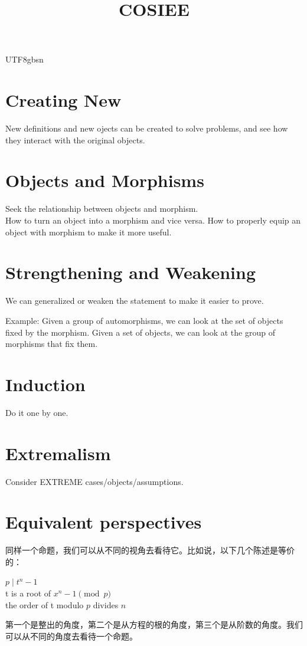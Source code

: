 \documentclass{article}
\begin{document}
\begin{CJK*}{UTF8}{gbsn}

\title{COSIEE}
\maketitle

\section{Creating New}
New definitions and new ojects can be created to solve problems, and see how they interact with the original objects.

\section{Objects and Morphisms}
Seek the relationship between objects and morphism. 
\\
How to turn an object into a morphism and vice versa. How to properly equip an object with morphism to make it more useful. 
\\

\section{Strengthening and Weakening}
We can generalized or weaken the statement to make it easier to prove. 

Example: 
Given a group of automorphisms, we can look at the set of objects fixed by the morphism. 
Given a set of objects, we can look at the group of morphisms that fix them. 
\section{Induction}
Do it one by one. 

\section{Extremalism}
Consider EXTREME cases/objects/assumptions.
\section{Equivalent perspectives}
同样一个命题，我们可以从不同的视角去看待它。比如说，以下几个陈述是等价的：
\begin{center}
    $p\mid t^n-1$
    \\
    t is a root of $x^n-1 \pmod{p}$
    \\
    the order of t modulo $p$ divides $n$
\end{center}
第一个是整出的角度，第二个是从方程的根的角度，第三个是从阶数的角度。我们可以从不同的角度去看待一个命题。





\end{CJK*}
\end{document}
